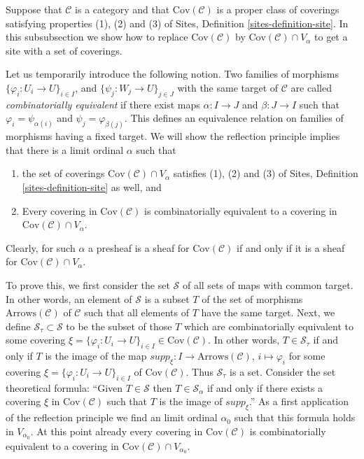 \noindent
Suppose that $\mathcal{C}$ is a category and
that $\text{Cov}(\mathcal{C})$ is a proper class of coverings
satisfying properties (1), (2) and (3) of Sites,
Definition \ref{sites-definition-site}.
In this subsubsection we show how to replace $\text{Cov}(\mathcal{C})$
by $\text{Cov}(\mathcal{C}) \cap V_\alpha$ to get a site
with a set of coverings.

\medskip\noindent
Let us temporarily introduce the following notion.
Two families of morphisms $\{\varphi_i : U_i \to U\}_{i\in I}$, and
$\{\psi_j : W_j \to U\}_{j\in J}$ with the same target of $\mathcal{C}$ are
called {\it combinatorially equivalent} if there exist maps
$\alpha : I \to J$ and $\beta : J\to I$ such that
$\varphi_i = \psi_{\alpha(i)}$ and $\psi_j = \varphi_{\beta(j)}$.
This defines an equivalence relation on families of morphisms
having a fixed target.
We will show the reflection principle implies that there is a limit ordinal
$\alpha$ such that
\begin{enumerate}
\item the set of coverings
$\text{Cov}(\mathcal{C}) \cap V_\alpha$ satisfies
(1), (2) and (3) of Sites, Definition \ref{sites-definition-site}
as well, and
\item Every covering in $\text{Cov}(\mathcal{C})$
is combinatorially equivalent
to a covering in $\text{Cov}(\mathcal{C}) \cap V_\alpha$.
\end{enumerate}
Clearly, for such $\alpha$ a presheaf is a sheaf for $\text{Cov}(\mathcal{C})$
if and only if it is a sheaf for $\text{Cov}(\mathcal{C}) \cap V_\alpha$.

\medskip\noindent
To prove this, we first consider the set $\mathcal{S}$ of all sets of maps
with common target. In other words, an element of
$\mathcal{S}$ is a subset $T$ of the set of morphisms 
$\text{Arrows}(\mathcal{C})$ of $\mathcal{C}$ such that all
elements of $T$ have the same target. Next, we define
$\mathcal{S}_\tau \subset \mathcal{S}$ to be the subset of those
$T$ which are combinatorially equivalent to some covering
$\xi = \{\varphi_i : U_i \to U\}_{i\in I} \in \text{Cov}(\mathcal{C})$.
In other words, $T \in \mathcal{S}_\tau$ if and only if $T$
is the image of the map $supp_\xi : I \to \text{Arrows}(\mathcal{C})$,
$i\mapsto \varphi_i$ for some covering
$\xi = \{\varphi_i : U_i \to U\}_{i\in I}$
of $\text{Cov}(\mathcal{C})$. Thus $\mathcal{S}_\tau$
is a set. Consider the set theoretical formula: ``Given $T \in \mathcal{S}$
then $T\in \mathcal{S}_\alpha$ if and only if there exists
a covering $\xi$ in $\text{Cov}(\mathcal{C})$ such that
$T$ is the image of $supp_\xi$.'' As a first application of the
reflection principle we find an limit ordinal $\alpha_0$ such that
this formula holds in $V_{\alpha_0}$. At this point already every
covering in $\text{Cov}(\mathcal{C})$ is combinatorially equivalent
to a covering in $\text{Cov}(\mathcal{C}) \cap V_{\alpha_0}$.

